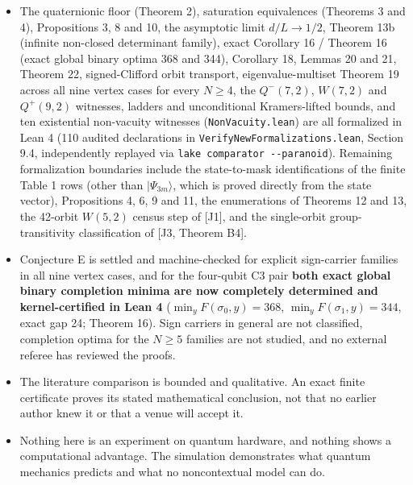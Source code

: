 \documentclass[11pt,a4paper]{article}
\begin{document}
\begin{itemize}
  and \nolinkurl{scripts/exact_degrees_n4_n5.py} independently reproduce the 42-orbit census and certify all 42
  orbits in exact integer arithmetic with zero floating point. Moving the 42-orbit census and all 42
  integer certificates themselves into the Lean kernel remains an open formalization target (while
  \(d(Q^+(7,2)) = 315\) is already fully kernel-proved).
\item
  The quaternionic floor (Theorem 2), saturation equivalences (Theorems 3 and 4), Propositions 3, 8 and
  10, the asymptotic limit \(d/L\to1/2\), Theorem 13b (infinite non-closed determinant family), exact
  Corollary 16 / Theorem 16\textquotesingle\textquotesingle{} (exact global binary optima 368 and 344), Corollary 18, Lemmas 20 and 21,
  Theorem 22, signed-Clifford orbit transport, eigenvalue-multiset Theorem 19 across all nine vertex
  cases for every \(N\ge4\), the \(Q^-(7,2)\), \(W(7,2)\) and \(Q^+(9,2)\) witnesses, ladders and unconditional
  Kramers-lifted bounds, and ten existential non-vacuity witnesses (\texttt{NonVacuity.lean}) are all formalized
  in Lean 4 (110 audited declarations in \nolinkurl{VerifyNewFormalizations.lean}, Section 9.4, independently
  replayed via \texttt{lake\ comparator\ -\/-paranoid}). Remaining formalization boundaries include the
  state-to-mask identifications of the finite Table 1 rows (other than \(|\Psi_{3m}\rangle\), which is
  proved directly from the state vector), Propositions 4, 6, 9 and 11, the enumerations of Theorems 12
  and 13, the 42-orbit \(W(5,2)\) census step of {[}J1{]}, and the single-orbit group-transitivity
  classification of {[}J3, Theorem B4{]}.
\item
  Conjecture E is settled and machine-checked for explicit sign-carrier families in all nine vertex
  cases, and for the four-qubit C3 pair \textbf{both exact global binary completion minima are now completely
  determined and kernel-certified in Lean 4} (\(\min_y F(\sigma_0,y) = 368\), \(\min_y F(\sigma_1,y) = 344\),
  exact gap 24; Theorem 16\textquotesingle\textquotesingle). Sign carriers in general are not classified, completion optima for the
  \(N \ge 5\) families are not studied, and no external referee has reviewed the proofs.
\item
  The literature comparison is bounded and qualitative. An exact finite certificate proves its
  stated mathematical conclusion, not that no earlier author knew it or that a venue will accept it.
\item
  Nothing here is an experiment on quantum hardware, and nothing shows a computational advantage.
  The simulation demonstrates what quantum mechanics predicts and what no noncontextual model can do.
\end{itemize}
\end{document}
